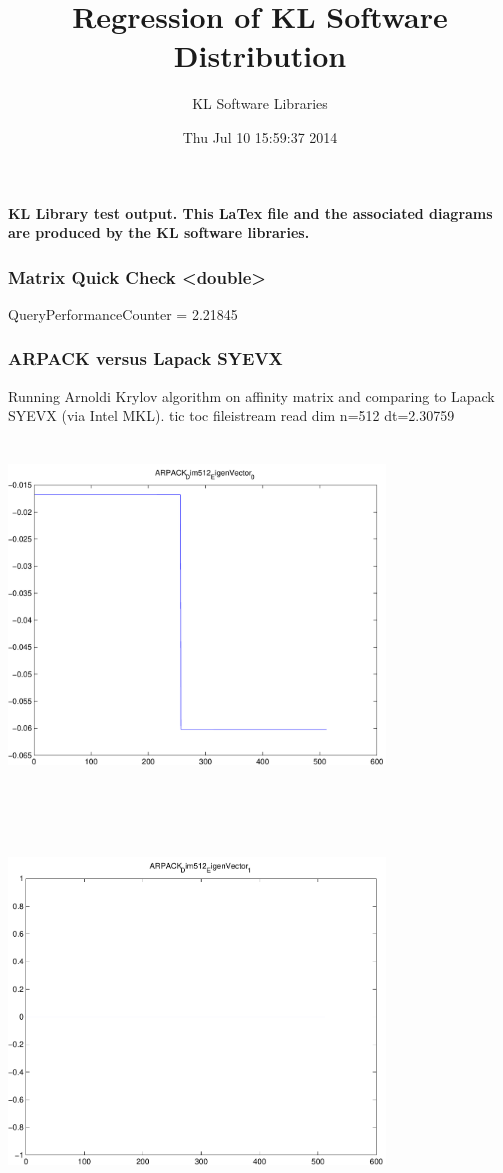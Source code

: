 \documentclass[9pt]{article}
\theoremstyle{plain}
\theoremstyle{definition}
\theoremstyle{remark}
\numberwithin{equation}{section}
\begin{document}
\title{Regression of KL Software Distribution   }
\author{KL Software Libraries}
\date{Thu Jul 10 15:59:37 2014
}
\maketitle
\textbf{ KL Library test output.  This LaTex file and the associated diagrams are produced by the KL software libraries.}
\subsubsection{Matrix Quick Check <double>}
QueryPerformanceCounter  =  2.21845
\subsubsection{ARPACK versus Lapack SYEVX}
Running Arnoldi Krylov algorithm on affinity matrix and comparing to Lapack SYEVX (via Intel MKL).
tic toc fileistream read dim n=512 dt=2.30759
\includegraphics[width=10.0cm,height=10.0cm]{ARPACK_Dim512_EigenVector_0.pdf}

\includegraphics[width=10.0cm,height=10.0cm]{ARPACK_Dim512_EigenVector_1.pdf}
\end{document}
